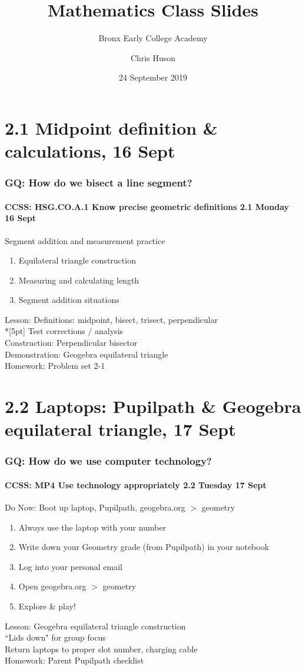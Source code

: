 \documentclass{beamer}
\title{Mathematics Class Slides}
\subtitle{Bronx Early College Academy}
\author{Chris Huson}
\date{24 September 2019}
\begin{document}
\frame{\titlepage}
\section[Outline]{}
\frame{\tableofcontents}

\section{2.1 Midpoint definition \& calculations, 16 Sept}
  \frame
  {
    \frametitle{GQ: How do we bisect a line segment?}
    \framesubtitle{CCSS: HSG.CO.A.1 Know precise geometric definitions \hfill \alert{2.1 Monday 16 Sept}}

    \begin{block}{Segment addition and measurement practice}
    \begin{enumerate}
      \item Equilateral triangle construction
      \item Measuring and calculating length
      \item Segment addition situations
    \end{enumerate}
    \end{block}
    Lesson: Definitions: midpoint, bisect, trisect, perpendicular \\*[5pt]
    Test corrections / analysis\\
    Construction: Perpendicular bisector\\
    Demonstration: Geogebra equilateral triangle\\ \smallskip
    Homework: Problem set 2-1 
  }

  \section{2.2 Laptops: Pupilpath \& Geogebra equilateral triangle, 17 Sept}
  \frame
  {
    \frametitle{GQ: How do we use computer technology?}
    \framesubtitle{CCSS: MP4 Use technology appropriately \hfill \alert{2.2 Tuesday 17 Sept}}
  
    \begin{block}{Do Now: Boot up laptop, Pupilpath, geogebra.org $>$ geometry}
    \begin{enumerate}
        \item Always use the laptop with your number
        \item Write down your Geometry grade (from Pupilpath) in your notebook
        \item Log into your personal email
        \item Open geogebra.org $>$ geometry
        \item Explore \& play!
    \end{enumerate}
    \end{block}
    Lesson: Geogebra equilateral triangle construction\\
    ``Lids down" for group focus \\
    Return laptops to proper slot number, charging cable \\ \vspace{0.25cm}
    Homework: Parent Pupilpath checklist
  }
\end{document}
